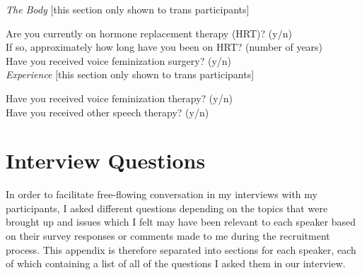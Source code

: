 \documentclass[12pt,twoside]{reedthesis}
\begin{document}
{\textit{The Body} [this section only shown to trans participants]

Are you currently on hormone replacement therapy (HRT)? (y/n)\\

If so, approximately how long have you been on HRT? (number of years) \\

Have you received voice feminization surgery? (y/n) \\

\textit{Experience} [this section only shown to trans participants]

Have you received voice feminization therapy? (y/n) \\

Have you received other speech therapy? (y/n) \\
}
\chapter{Interview Questions} \label{appendix_b}

In order to facilitate free-flowing conversation in my interviews with my participants, I asked different questions depending on the topics that were brought up and issues which I felt may have been relevant to each speaker based on their survey responses or comments made to me during the recruitment process. This appendix is therefore separated into sections for each speaker, each of which containing a list of all of the questions I asked them in our interview.
\end{document}
